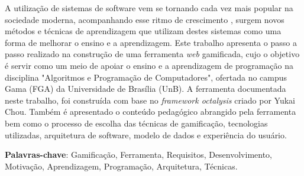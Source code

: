 \begin{resumo}

    A utilização de sistemas de software vem se tornando cada vez mais popular na sociedade moderna, acompanhando esse ritmo de crescimento
    , surgem novos métodos e técnicas de aprendizagem que utilizam destes sistemas como uma forma de melhorar o ensino e a aprendizagem. Este trabalho 
    apresenta o passo a passo realizado na construção de uma ferramenta \textit{web} gamificada, cujo o objetivo é servir como um meio
    de apoiar o ensino e a aprendizagem de programação na disciplina "Algoritmos e Programação de Computadores", ofertada no campus Gama (FGA) da 
    Universidade de Brasília (UnB). A ferramenta documentada neste trabalho, foi construída com base no \textit{framework octalysis} criado por Yukai Chou. Também é apresentado o conteúdo pedagógico abrangido pela ferramenta
    bem como o processo de escolha das técnicas de gamificação, tecnologias utilizadas, arquitetura de software, modelo de dados e experiência do usuário.
    
     \vspace{\onelineskip}
        
     \noindent
     \textbf{Palavras-chave}: Gamificação, Ferramenta, Requisitos, Desenvolvimento, Motivação, Aprendizagem, Programação, Arquitetura, Técnicas.
    \end{resumo}